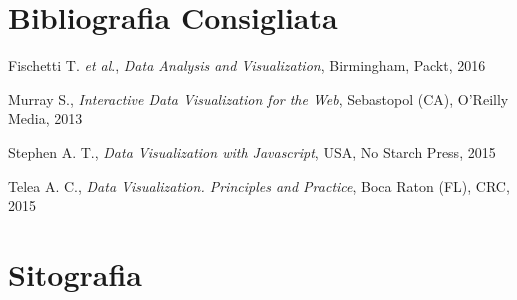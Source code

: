 \section*{Bibliografia Consigliata}
{\parindent0pt 
Fischetti T. \emph{et al}., \emph{Data Analysis and Visualization},
Birmingham, Packt, 2016

Murray S., \emph{Interactive Data Visualization for the Web}, Sebastopol
(CA), O'Reilly Media, 2013

Stephen A. T., \emph{Data Visualization with Javascript}, USA, No Starch
Press, 2015

Telea A. C., \emph{Data Visualization. Principles and Practice}, Boca
Raton (FL), CRC, 2015
}

\section*{Sitografia}
